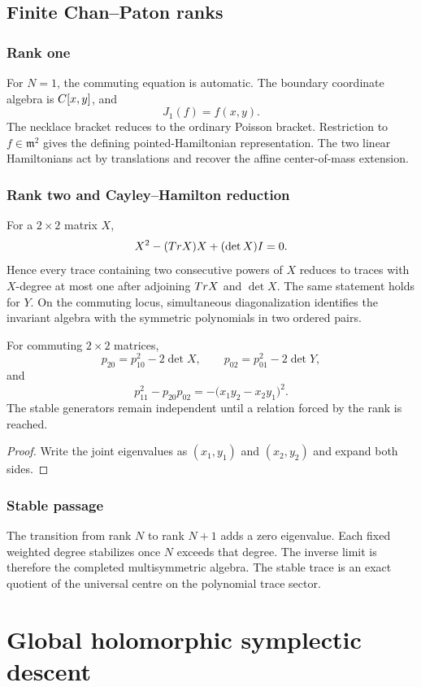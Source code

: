 \chapter{Finite Chan--Paton ranks}
\section{Rank one}
For $N=1$, the commuting equation is automatic.  The boundary coordinate algebra is $C[x,y]$, and
\[
 J_1(f)=f(x,y).
\]
The necklace bracket reduces to the ordinary Poisson bracket.  Restriction to $f\in\mathfrak m^2$ gives the defining pointed-Hamiltonian representation.  The two linear Hamiltonians act by translations and recover the affine center-of-mass extension.

\section{Rank two and Cayley--Hamilton reduction}
For a $2\times2$ matrix $X$,
\[
 X^2-(Tr X)X+(\det X)I=0.
\]
Hence every trace containing two consecutive powers of $X$ reduces to traces with $X$-degree at most one after adjoining $Tr X$ and $\det X$.  The same statement holds for $Y$.  On the commuting locus, simultaneous diagonalization identifies the invariant algebra with the symmetric polynomials in two ordered pairs.

\begin{proposition}
For commuting $2\times2$ matrices,
\[
 p_{20}=p_{10}^2-2\det X,
 \qquad
 p_{02}=p_{01}^2-2\det Y,
\]
and
\[
 p_{11}^2-p_{20}p_{02}
 =-\bigl(x_1y_2-x_2y_1\bigr)^2.
\]
The stable generators remain independent until a relation forced by the rank is reached.
\end{proposition}
\begin{proof}
Write the joint eigenvalues as $(x_1,y_1)$ and $(x_2,y_2)$ and expand both sides.
\end{proof}

\section{Stable passage}
The transition from rank $N$ to rank $N+1$ adds a zero eigenvalue.  Each fixed weighted degree stabilizes once $N$ exceeds that degree.  The inverse limit is therefore the completed multisymmetric algebra.  The stable trace is an exact quotient of the universal centre on the polynomial trace sector.


\part{Global holomorphic symplectic descent}

